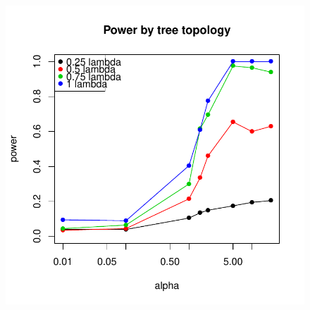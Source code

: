 \documentclass{elsarticle}
\makeatletter
\newenvironment{kframe}{%
 \def\FrameCommand##1{\hskip\@totalleftmargin \hskip-\fboxsep
 \colorbox{shadecolor}{##1}\hskip-\fboxsep
     \hskip-\linewidth \hskip-\@totalleftmargin \hskip\columnwidth}%
 \MakeFramed {\advance\hsize-\width
   \@totalleftmargin\z@ \linewidth\hsize
   \@setminipage}}%
 {\par\unskip\endMakeFramed}
\newenvironment{knitrout}{}{} %
\makeatother
\begin{document}
\begin{figure}
\begin{center}
\begin{knitrout}
{\begin{kframe}
\centering{}\includegraphics{Fig6b} 

\end{kframe}}
\end{knitrout}

\end{center}
\label{fig:sixb}
\end{figure}



\section*{ }%

%

\end{document}
